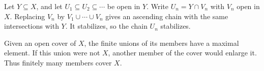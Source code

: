Let $Y\subseteq X$, and let $U_1\subseteq U_2\subseteq\cdots$ be open in $Y$. Write $U_n=Y\cap V_n$ with $V_n$ open in $X$. Replacing $V_n$ by $V_1\cup\cdots\cup V_n$ gives an ascending chain with the same intersections with $Y$. It stabilizes, so the chain $U_n$ stabilizes.

Given an open cover of $X$, the finite unions of its members have a maximal element. If this union were not $X$, another member of the cover would enlarge it. Thus finitely many members cover $X$.
